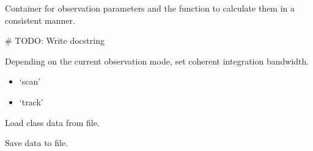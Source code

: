 \documentclass[letterpaper,10pt,english]{sphinxmanual}
\begin{document}
\begin{fulllineitems}
\label{\detokenize{modules/simulation:simulation.ObservationParameters}}
Container for observation parameters and the function to calculate them in a consistent manner.

\# TODO: Write docstring

\begin{fulllineitems}
\label{\detokenize{modules/simulation:simulation.ObservationParameters.calculate_parameters}}
\end{fulllineitems}


\begin{fulllineitems}
\label{\detokenize{modules/simulation:simulation.ObservationParameters.configure_radar_to_observation}}
Depending on the current observation mode, set coherent integration bandwidth.

\begin{itemize}
\item {} 
‘scan’

\item {} 
‘track’

\end{itemize}

\end{fulllineitems}


\begin{fulllineitems}
\label{\detokenize{modules/simulation:simulation.ObservationParameters.load}}
Load class data from file.

\end{fulllineitems}


\begin{fulllineitems}
\label{\detokenize{modules/simulation:simulation.ObservationParameters.save}}
Save data to file.

\end{fulllineitems}


\end{fulllineitems}
\end{document}
